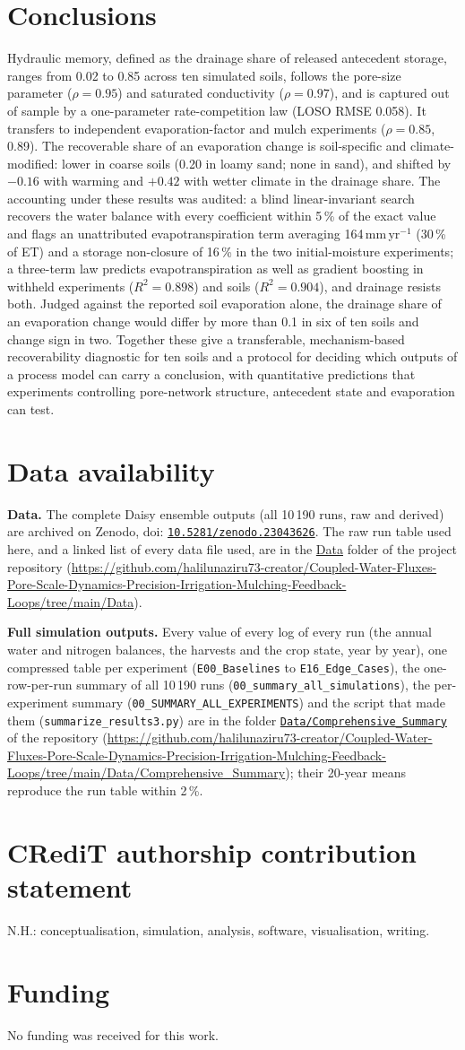 \documentclass[preprint,12pt,authoryear]{elsarticle}
\newcommand{\doihl}[1]{doi: \href{https://doi.org/#1}{\nolinkurl{#1}}}
\newcommand{\repourl}{https://github.com/halilunaziru73-creator/Coupled-Water-Fluxes-Pore-Scale-Dynamics-Precision-Irrigation-Mulching-Feedback-Loops}
\newcommand{\dataurl}{\repourl/tree/main/Data}
\newcommand{\datalink}{\href{\dataurl}{Data}}
\newcommand{\csurl}{https://github.com/halilunaziru73-creator/Coupled-Water-Fluxes-Pore-Scale-Dynamics-Precision-Irrigation-Mulching-Feedback-Loops/tree/main/Data/Comprehensive_Summary}
\newcommand{\cslink}{\href{\csurl}{\nolinkurl{Data/Comprehensive_Summary}}}
\newcommand{\csavail}{\par\smallskip\textbf{Full simulation outputs.} Every value of every log of every run (the annual water and nitrogen balances, the harvests and the crop state, year by year), one compressed table per experiment (\texttt{E00\_Baselines} to \texttt{E16\_Edge\_Cases}), the one-row-per-run summary of all 10\,190 runs (\texttt{00\_summary\_all\_simulations}), the per-experiment summary (\texttt{00\_SUMMARY\_ALL\_EXPERIMENTS}) and the script that made them (\texttt{summarize\_results3.py}) are in the folder \cslink{} of the repository (\url{\csurl}); their 20-year means reproduce the run table within 2\,\%.}
\newcommand{\dataavail}{%
\textbf{Data.} The complete Daisy ensemble outputs (all 10\,190 runs, raw and derived) are archived on Zenodo, \doihl{10.5281/zenodo.23043626}. The raw run table used here, and a linked list of every data file used, are in the \datalink{} folder of the project repository (\url{\dataurl}).\csavail
}
\begin{document}
\section{Conclusions}
Hydraulic memory, defined as the drainage share of released antecedent storage, ranges from 0.02 to 0.85 across ten simulated soils, follows the pore-size parameter ($\rho=0.95$) and saturated conductivity ($\rho=0.97$), and is captured out of sample by a one-parameter rate-competition law (LOSO RMSE 0.058). It transfers to independent evaporation-factor and mulch experiments ($\rho=0.85$, 0.89). The recoverable share of an evaporation change is soil-specific and climate-modified: lower in coarse soils (0.20 in loamy sand; none in sand), and shifted by $-0.16$ with warming and $+0.42$ with wetter climate in the drainage share. The accounting under these results was audited: a blind linear-invariant search recovers the water balance with every coefficient within 5\,\% of the exact value and flags an unattributed evapotranspiration term averaging 164\,mm\,yr$^{-1}$ (30\,\% of ET) and a storage non-closure of 16\,\% in the two initial-moisture experiments; a three-term law predicts evapotranspiration as well as gradient boosting in withheld experiments ($R^2=0.898$) and soils ($R^2=0.904$), and drainage resists both. Judged against the reported soil evaporation alone, the drainage share of an evaporation change would differ by more than 0.1 in six of ten soils and change sign in two. Together these give a transferable, mechanism-based recoverability diagnostic for ten soils and a protocol for deciding which outputs of a process model can carry a conclusion, with quantitative predictions that experiments controlling pore-network structure, antecedent state and evaporation can test.

\section*{Data availability}
\dataavail

\section*{CRediT authorship contribution statement}
N.H.: conceptualisation, simulation, analysis, software, visualisation, writing.

\section*{Funding}
No funding was received for this work.
\end{document}
